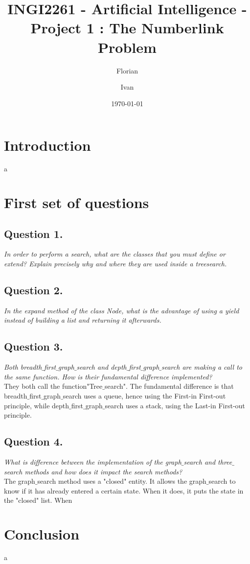 \documentclass[a4paper, 12pt]{article}
\author{Florian \bsc{Thuin}  \and Ivan \bsc{Ahad}}
\title{INGI2261 - Artificial Intelligence - Project 1 : The Numberlink Problem}
\date{\today}
\begin{document}
\maketitle
\section{Introduction}
a
\section{First set of questions}
\subsection{Question 1.}
\textit{In order to perform a search, what are the classes that you must define or extend? Explain precisely why and where they are used inside a treesearch.}
\subsection{Question 2.}
\textit{In the expand method of the class Node, what is the advantage of using a yield instead of building a list and returning it afterwards.}

\subsection{Question 3.}
\textit{Both breadth$\_$first$\_$graph$\_$search and depth$\_$first$\_$graph$\_$search are making a call to the same function. How is their fundamental difference implemented?}
\\
They both call the function"Tree$\_$search". The fundamental difference is that breadth$\_$first$\_$graph$\_$search uses a queue, hence using the First-in First-out principle, while depth$\_$first$\_$graph$\_$search uses a stack, using the Last-in First-out principle. 

\subsection{Question 4.}
\textit{What is difference between the implementation of the graph$\_$search and three$\_$search methods and how does it impact the search methods?}
\\
The graph$\_$search method uses a "closed" entity. It allows the graph$\_$search to know if it has already entered a certain state. When it does, it puts the state in the "closed" list. When 



\section{Conclusion}
a
\end{document}
